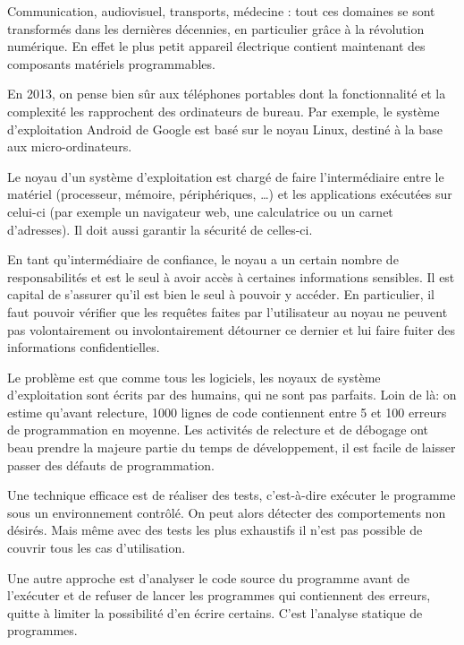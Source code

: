 Communication,
audiovisuel,
transports,
médecine :
tout ces domaines se sont transformés dans les dernières décennies,
en particulier grâce à la révolution numérique.
En effet le plus petit appareil électrique contient maintenant des composants
matériels programmables.


En 2013, on pense bien sûr aux téléphones portables dont la fonctionnalité et la
complexité les rapprochent des ordinateurs de bureau. Par exemple, le système
d'exploitation Android de Google est basé sur le noyau Linux, destiné à la base
aux micro-ordinateurs.

Le noyau d'un système d'exploitation est chargé de faire l'intermédiaire entre
le matériel (processeur, mémoire, périphériques, …) et les applications
exécutées sur celui-ci (par exemple un navigateur web, une calculatrice ou un
carnet d'adresses). Il doit aussi garantir la sécurité de celles-ci.

En tant qu'intermédiaire de confiance, le noyau a un certain nombre de
responsabilités et est le seul à avoir accès à certaines informations sensibles.
Il est capital de s'assurer qu'il est bien le seul à pouvoir y accéder. En
particulier, il faut pouvoir vérifier que les requêtes faites par l'utilisateur
au noyau ne peuvent pas volontairement ou involontairement détourner ce dernier
et lui faire fuiter des informations confidentielles.

Le problème est que comme tous les logiciels, les noyaux de système
d'exploitation sont écrits par des humains, qui ne sont pas parfaits. Loin de
là: on estime qu'avant relecture, 1000 lignes de code contiennent entre 5 et 100
erreurs de programmation en moyenne.
Les activités de relecture et de
débogage ont beau prendre la majeure partie du temps de développement, il est
facile de laisser passer des défauts de programmation.

Une technique efficace est de réaliser des tests, c'est-à-dire exécuter le
programme sous un environnement contrôlé. On peut alors détecter des
comportements non désirés. Mais même avec des tests les plus exhaustifs il n'est
pas possible de couvrir tous les cas d'utilisation.

Une autre approche est d'analyser le code source du programme avant de
l'exécuter et de refuser de lancer les programmes qui contiennent des erreurs,
quitte à limiter la possibilité d'en écrire certains. C'est l'analyse statique
de programmes.

